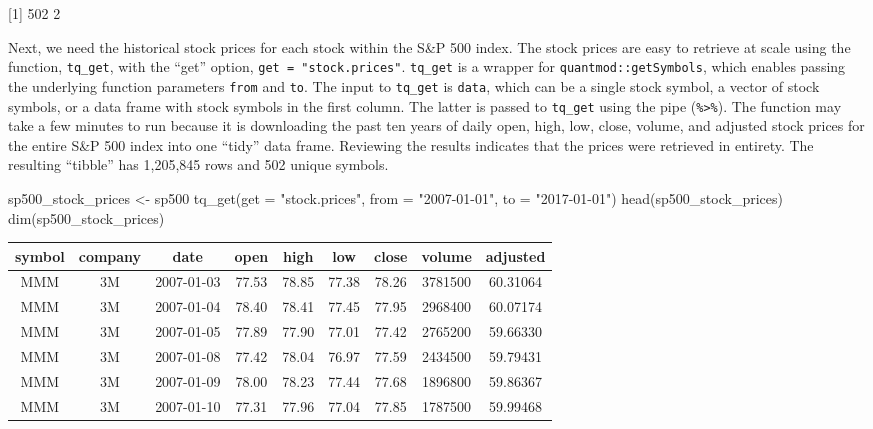 {[}1{]} 502 2

\hspace{20 mm}

Next, we need the historical stock prices for each stock within the S\&P
500 index. The stock prices are easy to retrieve at scale using the
function, \texttt{tq\_get}, with the ``get'' option,
\texttt{get\ =\ "stock.prices"}. \texttt{tq\_get} is a wrapper for
\texttt{quantmod::getSymbols}, which enables passing the underlying
function parameters \texttt{from} and \texttt{to}. The input to
\texttt{tq\_get} is \texttt{data}, which can be a single stock symbol, a
vector of stock symbols, or a data frame with stock symbols in the first
column. The latter is passed to \texttt{tq\_get} using the pipe
(\texttt{\%\textgreater{}\%}). The function may take a few minutes to
run because it is downloading the past ten years of daily open, high,
low, close, volume, and adjusted stock prices for the entire S\&P 500
index into one ``tidy'' data frame. Reviewing the results indicates that
the prices were retrieved in entirety. The resulting ``tibble'' has
1,205,845 rows and 502 unique symbols.

\begin{Schunk}
\begin{Sinput}
sp500_stock_prices <- sp500 %
    tq_get(get  = "stock.prices", 
           from = "2007-01-01", 
           to   = "2017-01-01")
head(sp500_stock_prices)
dim(sp500_stock_prices)
\end{Sinput}
\end{Schunk}

\begin{tabular}{ccccccccc}
\toprule
symbol & company & date & open & high & low & close & volume & adjusted\\
\midrule
MMM & 3M & 2007-01-03 & 77.53 & 78.85 & 77.38 & 78.26 & 3781500 & 60.31064\\
MMM & 3M & 2007-01-04 & 78.40 & 78.41 & 77.45 & 77.95 & 2968400 & 60.07174\\
MMM & 3M & 2007-01-05 & 77.89 & 77.90 & 77.01 & 77.42 & 2765200 & 59.66330\\
MMM & 3M & 2007-01-08 & 77.42 & 78.04 & 76.97 & 77.59 & 2434500 & 59.79431\\
MMM & 3M & 2007-01-09 & 78.00 & 78.23 & 77.44 & 77.68 & 1896800 & 59.86367\\
MMM & 3M & 2007-01-10 & 77.31 & 77.96 & 77.04 & 77.85 & 1787500 & 59.99468\\
\bottomrule
\end{tabular}

